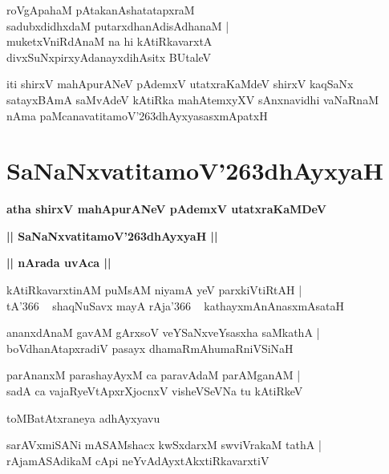 \documentclass[twoside,12pt,openright]{book}
\def\S{\char'263}
\newcounter{shloka}[chapter]
\def\uvaca#1{\centerline{{\large\textbf{#1}}}}
\begin{document}
\begin{shloka}%
roVgApahaM pAtakanAshatatapxraM \\
sadubxdidhxdaM putarxdhanAdisAdhanaM |\\
muketxVniRdAnaM na hi kAtiRkavarxtA \\
divxSuNxpirxyAdanayxdihAsitx BUtaleV 
\end{shloka}

\begin{center}
iti shirxV mahApurANeV pAdemxV utatxraKaMdeV shirxV kaqSaNx satayxBAmA saMvAdeV kAtiRka mahAtemxyXV 
sAnxnavidhi vaNaRnaM nAma paMcanavatitamoV\S dhAyxyasasxmApatxH
\end{center}

\chapter{SaNaNxvatitamoV\S dhAyxyaH}

\begin{center}
{\LARGE\bfseries atha shirxV mahApurANeV pAdemxV utatxraKaMDeV}
\end{center}

\begin{center}
{\LARGE\bfseries || SaNaNxvatitamoV\S dhAyxyaH || }
\end{center}

\uvaca{|| nArada uvAca ||}
 
\begin{shloka}%
kAtiRkavarxtinAM puMsAM niyamA yeV parxkiVtiRtAH |\\
tA\char'366 ~ shaqNuSavx mayA rAja\char'366 ~ kathayxmAnAnasxmAsataH 
\end{shloka}

\begin{shloka}%
ananxdAnaM gavAM gArxsoV veYSaNxveYsasxha saMkathA |\\
boVdhanAtapxradiV pasayx dhamaRmAhumaRniVSiNaH 
\end{shloka}

\begin{shloka}%
parAnanxM parashayAyxM ca paravAdaM parAMganAM |\\
sadA ca vajaRyeVtApxrXjocnxV visheVSeVNa tu kAtiRkeV
\end{shloka}

\begin{center}
toMBatAtxraneya adhAyxyavu
\end{center}

\begin{shloka}%
sarAVxmiSANi mASAMshacx kwSxdarxM swviVrakaM tathA |\\
rAjamASAdikaM cApi neYvAdAyxtAkxtiRkavarxtiV 
\end{shloka}
\end{document}
